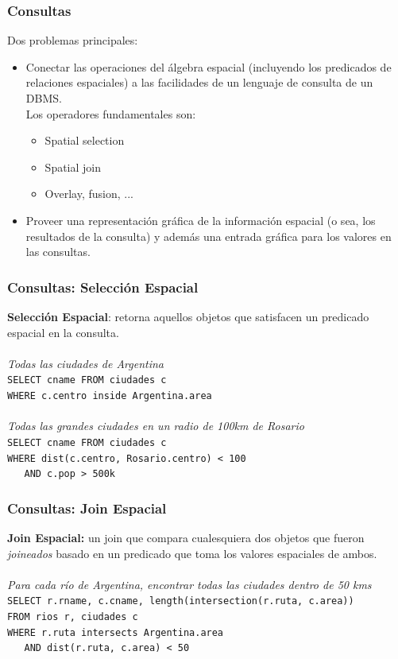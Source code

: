\documentclass[a4paper,12pt,oneside]{report}
\begin{document}
\subsubsection*{Consultas}
Dos problemas principales:
\begin{itemize}
\item Conectar las operaciones del \'algebra espacial (incluyendo los predicados de relaciones espaciales) a las facilidades de un lenguaje de consulta de un DBMS.\\
Los operadores fundamentales son:
\begin{itemize}
\item Spatial selection
\item Spatial join
\item Overlay, fusion, ...
\end{itemize}
\item Proveer una representaci\'on gr\'afica de la informaci\'on espacial (o sea, los resultados de la consulta) y adem\'as una entrada gr\'afica para los valores en las consultas.
\end{itemize}

\subsubsection*{Consultas: Selecci\'on Espacial}
\textbf{Selecci\'on Espacial}: retorna aquellos objetos que satisfacen un predicado espacial en la consulta.\\
\ \\
\textit{Todas las ciudades de Argentina}\\
\texttt{SELECT cname FROM ciudades c \\
WHERE c.centro inside Argentina.area}\\
\ \\
\textit{Todas las grandes ciudades en un radio de 100km de Rosario}\\
\texttt{SELECT cname FROM ciudades c \\
WHERE dist(c.centro, Rosario.centro) < 100\\
\ \ \ AND c.pop > 500k}

\subsubsection*{Consultas: Join Espacial}
\textbf{Join Espacial:} un join que compara cualesquiera dos objetos que fueron \textit{joineados} basado en un predicado que toma los valores espaciales de ambos.\\
\ \\
\textit{Para cada r\'io de Argentina, encontrar todas las ciudades dentro de 50 kms}\\
\texttt{SELECT r.rname, c.cname, length(intersection(r.ruta, c.area))\\
FROM rios r, ciudades c \\
WHERE r.ruta intersects Argentina.area \\
\ \ \ AND dist(r.ruta, c.area) < 50}
\end{document}
